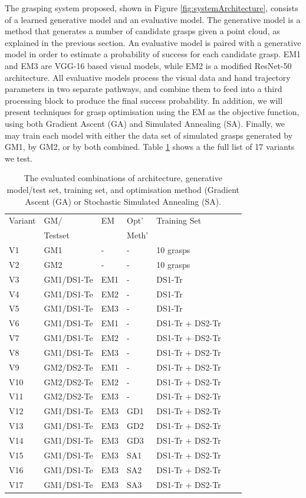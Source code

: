 The grasping system proposed, shown in Figure \ref{fig:systemArchitecture}, consists of a learned generative model and an evaluative model. The generative model is a method that generates a number of candidate grasps given a point cloud, as explained in the previous section. An evaluative model is paired with a generative model in order to estimate a probability of success for each candidate grasp. EM1 and EM3 are VGG-16 based visual models, while EM2 is a modified ResNet-50 architecture. All evaluative models process the visual data and hand trajectory parameters in two separate pathways, and combine them to feed into a third processing block to produce the final success probability. In addition, we will present techniques for grasp optimisation using the EM as the objective function, using both Gradient Ascent (GA) and Simulated Annealing (SA). Finally, we may train each model with either the data set of simulated grasps generated by GM1, by GM2, or by both combined. Table \ref{table:GEBreakdown} shows a the full list of 17 variants we test.

\begin{table}[]
\centering
\begin{tabular}{|l|l|l|l|l|l|l|}
\hline
Variant & GM/  & EM & Opt'  & Training Set \\ 
 & Testset & & Meth' & \\ \hline
V1 & GM1    & - & - & 10 grasps  \\ \hline
V2 & GM2    & - & - & 10 grasps  \\ \hline
V3 & GM1/DS1-Te & EM1 & - & DS1-Tr \\ \hline
V4 & GM1/DS1-Te & EM2 & - & DS1-Tr \\ \hline
V5 & GM1/DS1-Te & EM3 & - & DS1-Tr  \\ \hline
V6 & GM1/DS1-Te & EM1 & - & DS1-Tr + DS2-Tr \\ \hline
V7 & GM1/DS1-Te & EM2 & - & DS1-Tr + DS2-Tr \\ \hline
V8 & GM1/DS1-Te & EM3 & - & DS1-Tr + DS2-Tr \\ \hline
V9 & GM2/DS2-Te & EM1 & - & DS1-Tr + DS2-Tr \\ \hline
V10 & GM2/DS2-Te & EM2 & - & DS1-Tr + DS2-Tr \\ \hline
V11 & GM2/DS2-Te & EM3 & - & DS1-Tr + DS2-Tr \\ \hline
V12 & GM1/DS1-Te & EM3 & GD1 & DS1-Tr + DS2-Tr \\ \hline
V13 & GM1/DS1-Te & EM3 & GD2 & DS1-Tr + DS2-Tr \\ \hline
V14 & GM1/DS1-Te & EM3 & GD3 & DS1-Tr + DS2-Tr \\ \hline
V15 & GM1/DS1-Te & EM3 & SA1 & DS1-Tr + DS2-Tr \\ \hline
V16 & GM1/DS1-Te & EM3 & SA2 & DS1-Tr + DS2-Tr \\ \hline
V17 & GM1/DS1-Te & EM3 & SA3 & DS1-Tr + DS2-Tr \\ \hline
\end{tabular}
\caption{The evaluated combinations of architecture, generative model/test set, training set, and optimisation method (Gradient Ascent (GA) or Stochastic Simulated Annealing (SA).}
\label{table:GEBreakdown}
\end{table}

